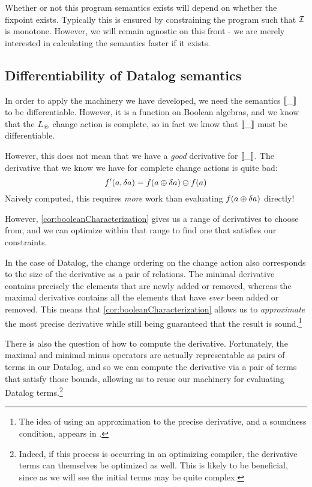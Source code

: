 Whether or not this program semantics exists will depend on whether the fixpoint
exists. Typically this is ensured by constraining the program such that $\mathcal{I}$
is monotone. However, we will remain agnostic on this front - we are merely
interested in calculating the semantics faster if it exists.

\subsection{Differentiability of Datalog semantics}
\label{sec:datalogDifferentiability}

In order to apply the machinery we have developed, we need the semantics $\llbracket \_ \rrbracket$ to
be differentiable. However, it is a function on Boolean algebras, and we know
that the $L_\circledast$ change action is complete, so in fact we know that
$\llbracket \_ \rrbracket$ must be differentiable.

However, this does not mean that we have a \emph{good} derivative for
$\llbracket \_ \rrbracket$. The derivative that we know we have for complete change actions
is quite bad:
$$f'(a, \delta a) = f(a \oplus \delta a) \ominus f(a)$$
Naively computed, this requires \emph{more} work than evaluating $f(a \oplus \delta a)$ directly!

However, \cref{cor:booleanCharacterization} gives us a range of derivatives to
choose from, and we can optimize within that range to find one that satisfies
our constraints.

In the case of Datalog, the change ordering on the change action also
corresponds to the size of the derivative as a pair of relations. The minimal
derivative contains precisely the elements that are newly added or removed,
whereas the maximal derivative contains all the elements that have \emph{ever}
been added or removed. This means that \cref{cor:booleanCharacterization} allows
us to \emph{approximate} the most precise derivative while still being
guaranteed that the result is sound.\footnote{The idea of using an approximation
to the precise derivative, and a soundness condition, appears in \textcite{bancilhon1986amateur}.}

There is also the question of how to compute the derivative. Fortunately, the
maximal and minimal minus operators are actually representable as pairs of terms
in our Datalog, and so we can compute the derivative via a pair of terms that
satisfy those bounds, allowing us to reuse our machinery for evaluating Datalog
terms.\footnote{Indeed, if this process is occurring in an optimizing compiler,
  the derivative terms can themselves be optimized as well. This is likely to be
  beneficial, since as we will see the initial terms may be quite complex.}

